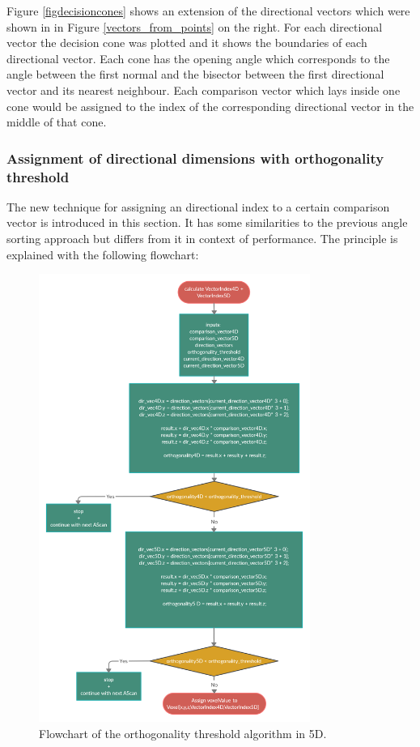 Figure \ref{figdecisioncones} shows an extension of the directional vectors which were shown in in Figure \ref{vectors_from_points} on the right. For each directional vector the decision cone was plotted and it shows the boundaries of each directional vector. Each cone has the opening angle which corresponds to the angle between the first normal and the bisector between the first directional vector and its nearest neighbour. Each comparison vector which lays inside one cone would be assigned to the index of the corresponding directional vector in the middle of that cone.

\subsubsection{Assignment of directional dimensions with orthogonality threshold}

The new technique for assigning an directional index to a certain comparison vector is introduced in this section. It has some similarities to the previous angle sorting approach but differs from it in context of performance. The principle is explained with the following flowchart:

\begin{figure}[H]
    \centering
    \includegraphics[width=0.79\textwidth]{Graphics/Fringe_Orthogonality.png}
    \caption{Flowchart of the orthogonality threshold algorithm in 5D.}
    \label{ortho_threshold_flow}
\end{figure}

